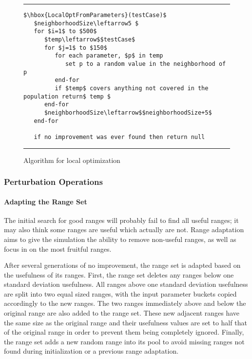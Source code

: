 \documentclass[runningheads]{llncs}
\begin{document}
\begin{figure}[h!]
\begin{center}
\hrule
\medskip
\begin{Verbatim}[fontfamily=tt, xleftmargin=10pt, commandchars=\\\{\},
codes={\catcode`$=3\catcode`^=7\catcode`_=8}]
$\hbox{LocalOptFromParameters}(testCase)$
   $neighborhoodSize\leftarrow5 $
   for $i=1$ to $500$ 
      $temp\leftarrow$$testCase$
      for $j=1$ to $150$
         for each parameter, $p$ in temp
            set p to a random value in the neighborhood of p
         end-for     
         if $temp$ covers anything not covered in the population return$ temp $
      end-for
      $neighborhoodSize\leftarrow$$neighborhoodSize+5$
   end-for
   
   if no improvement was ever found then return null
\end{Verbatim}
\hrule
\end{center}
\caption{Algorithm for local optimization \label{fig:lcOptFP}}
\end{figure}




\FloatBarrier
\subsubsection{Perturbation Operations}
\paragraph{Adapting the Range Set} The initial search for good ranges will probably fail to find all useful ranges; it may also think some ranges are useful which actually are not. Range adaptation aims to give the simulation the ability to remove non-useful ranges, as well as focus in on the most fruitful ranges.

After several generations of no improvement, the range set is adapted based on the usefulness of its ranges. First, the range set deletes any ranges below one standard deviation usefulness. All ranges above one standard deviation usefulness are split into two equal sized ranges, with the input parameter buckets copied accordingly to the new ranges. The two ranges immediately above and below the original range are also added to the range set. These new adjacent ranges have the same size as the original range and their usefulness values are set to half that of the original range in order to prevent them being completely ignored. Finally, the range set adds a new random range into its pool to avoid missing ranges not found during initialization or a previous range adaptation.
\end{document}
